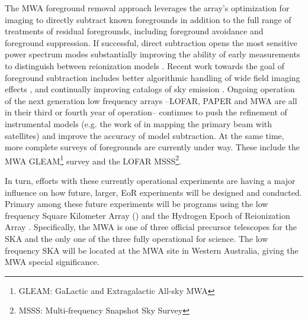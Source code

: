 \documentclass[twolcolumn,iop]{emulateapj}
\begin{document}
The MWA foreground removal approach leverages the array's optimization for imaging to directly subtract known foregrounds in addition to the full range of treatments of residual foregrounds, including foreground avoidance and foreground suppression.  If successful, direct subtraction opens the most sensitive power spectrum modes substantially improving the ability of early measurements to distinguish between reionization models \citep{Beardsley:2013p9952,Pober:2014p10390}. Recent work towards the goal of foreground subtraction includes better algorithmic handling of wide field imaging effects \citep{Tasse:2012p9459,Bhatnagar..2013ApJ,Sullivan:2012p9457,Ord:2010p8442}, and continually improving catalogs of sky emission \citep{deOliveiraCosta:2008p2242,Jacobs:2011p8438,Hurley-walker:2014p45,2014AAS...22342101M}. Ongoing operation of the next generation low frequency arrays --LOFAR, PAPER and MWA are all in their  third or fourth year of operation-- continues to push the refinement of instrumental models (e.g. the work of \cite{2015RaSc...50..614N} in mapping the primary beam with satellites) and improve the accuracy of model subtraction.  At the same time, more complete surveys of foregrounds are currently under way. These include the MWA GLEAM\footnote{GLEAM: GaLactic and Extragalactic All-sky MWA} survey \citep{2015PASA...32...25W}  and the LOFAR MSSS\footnote{MSSS: Multi-frequency Snapshot Sky Survey}.   

In turn, efforts with these currently operational experiments are having a major influence on how future, larger, EoR experiments will be designed and conducted.  Primary among these future experiments will be programs using the low frequency Square Kilometer Array (\cite{2014aska.confE...1K}) and the Hydrogen Epoch of Reionization Array \citep[HERA][]{Pober:2014p10390}.  Specifically, the MWA is one of three official precursor telescopes for the SKA and the only one of the three fully operational for science.  The low frequency SKA will be located at the MWA site in Western Australia, giving the MWA special significance.
\end{document}

